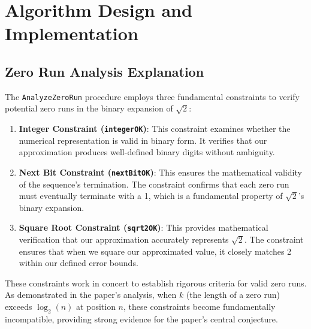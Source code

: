 \section{Algorithm Design and Implementation}

\subsection{Zero Run Analysis Explanation}
The \texttt{AnalyzeZeroRun} procedure employs three fundamental constraints to verify potential
zero runs in the binary expansion of $\sqrt{2}$:
\begin{enumerate}
    \item \textbf{Integer Constraint (\texttt{integerOK})}: This constraint examines whether the numerical
    representation is valid in binary form. It verifies that our approximation produces
    well-defined binary digits without ambiguity.
    \item \textbf{Next Bit Constraint (\texttt{nextBitOK})}: This ensures the mathematical validity of the
    sequence’s termination. The constraint confirms that each zero run must eventually
    terminate with a 1, which is a fundamental property of $\sqrt{2}$’s binary expansion.
    \item \textbf{Square Root Constraint (\texttt{sqrt2OK})}: This provides mathematical verification that
    our approximation accurately represents $\sqrt{2}$. The constraint ensures that when we
    square our approximated value, it closely matches 2 within our defined error bounds.
\end{enumerate}

These constraints work in concert to establish rigorous criteria for valid zero runs. As
demonstrated in the paper’s analysis, when $k$ (the length of a zero run) exceeds $\log_2(n)$ at
position $n$, these constraints become fundamentally incompatible, providing strong evidence
for the paper’s central conjecture.

